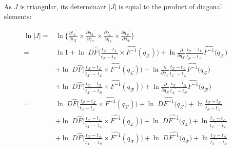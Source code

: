 \documentclass[12pt]{article}
\begin{document}
As $J$ is triangular, its determinant $|J|$ is equal to the product of diagonal elements:


\begin{align}
	\ln |J| =&  \ln \{ \frac{\partial {t_\mathcal{X}}^\prime}{\partial t_\mathcal{X}} \times \frac{\partial {q_\mathcal{X}}^\prime}{\partial q_\mathcal{X}} \times \frac{\partial {q_\mathcal{L}}^\prime}{\partial q_\mathcal{L}} \times \frac{\partial {q_\mathcal{R}}^\prime}{\partial q_\mathcal{R}} \} \nonumber\\
		=& \ln 1 + \ln \; D \hat{F}\Big( \frac{t_\mathcal{P} - t_\mathcal{X}}{t_\mathcal{P} - {t_\mathcal{X}}^\prime} \times \hat{F^{-1}}(q_\mathcal{X})  \Big) + \ln \frac{\partial}{\partial q_\mathcal{X}}  \frac{t_\mathcal{P} - t_\mathcal{X}}{t_\mathcal{P} - {t_\mathcal{X}}^\prime} \hat{F^{-1}} \Big( q_\mathcal{X} \Big) \nonumber\\
		& + \ln \; D\hat{F}\Big( \frac{t_X - t_\mathcal{L}}{{t_\mathcal{X}}^\prime - t_\mathcal{L}} \times \hat{F^{-1}}(q_\mathcal{L}) \Big) + \ln \frac{\partial}{\partial q_\mathcal{L}} \frac{t_\mathcal{X} - t_\mathcal{L}}{{t_\mathcal{X}}^\prime - t_\mathcal{L}} \hat{F^{-1}} \Big( q_\mathcal{L} \Big) \nonumber\\
		& + \ln \; D \hat{F}\Big( \frac{t_\mathcal{X} - t_\mathcal{R}}{{t_\mathcal{X}}^\prime - t_\mathcal{R}} \times \hat{F^{-1}}(q_\mathcal{R}) \Big) + \ln \frac{\partial}{\partial q_\mathcal{R}} \frac{t_\mathcal{X} - t_\mathcal{R}}{{t_\mathcal{X}}^\prime - t_\mathcal{R}} \hat{F^{-1}} \Big( q_\mathcal{R} \Big) \nonumber\\
		=& \ln \; D \hat{F}\Big( \frac{t_\mathcal{P} - t_\mathcal{X}}{t_\mathcal{P} - {t_\mathcal{X}}^\prime} \times \hat{F^{-1}}(q_\mathcal{X})  \Big) + \ln \; D  \hat{F^{-1}} \Big( q_\mathcal{X} \Big) + \ln \frac{t_\mathcal{P} - t_\mathcal{X}}{t_\mathcal{P} - {t_\mathcal{X}}^\prime} \nonumber\\
		& + \ln \; D\hat{F}\Big( \frac{t_\mathcal{X} - t_\mathcal{L}}{{t_\mathcal{X}}^\prime - t_\mathcal{L}} \times \hat{F^{-1}}(q_\mathcal{L}) \Big) + \ln \; D \hat{F^{-1}} \Big( q_\mathcal{L} \Big) + \ln  \frac{t_\mathcal{X} - t_\mathcal{L}}{{t_\mathcal{X}}^\prime - t_\mathcal{L}} \nonumber \\
		& + \ln \; D \hat{F}\Big( \frac{t_\mathcal{X} - t_\mathcal{R}}{{t_\mathcal{X}}^\prime - t_\mathcal{R}} \times \hat{F^{-1}}(q_\mathcal{R}) \Big) + \ln \; D\hat{F^{-1}} \Big( q_\mathcal{R} \Big) + \ln \frac{t_\mathcal{X} - t_\mathcal{R}}{{t_\mathcal{X}}^\prime - t_\mathcal{R}} .
\end{align}
\end{document}
